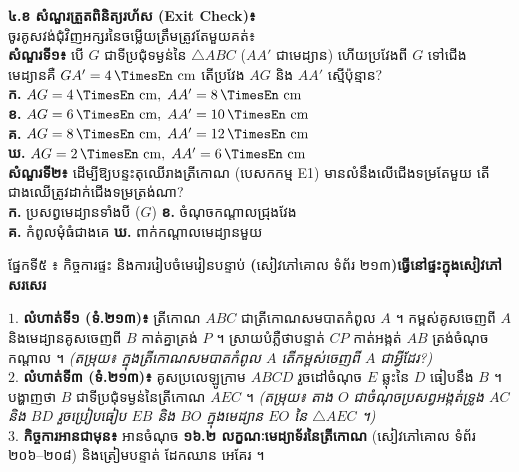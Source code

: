 \documentclass[a4paper,10pt]{article}
\newcommand{\en}[1]{{\TimesEn #1}}
\newcommand{\enbf}[1]{{\TimesEn\textbf{#1}}}
\newcommand{\unit}[1]{\,\text{\en{#1}}}
\newcommand{\tri}[1]{\ensuremath{\triangle #1}}
\newcommand{\secbar}[2]{%
  \vspace{3pt}%
  \begin{tcolorbox}[
    enhanced, sharp corners, colback=headgray, colframe=black,
    boxrule=0.9pt, boxsep=1pt, top=2.5pt, bottom=2.5pt, left=6pt, right=6pt,
    after skip=3pt
  ]
    {\muol\fontsize{9.2pt}{13.5pt}\selectfont #1}\hfill{\fontsize{8.3pt}{11.5pt}\selectfont\textbf{#2}}
  \end{tcolorbox}%
}
\begin{document}
\begin{minipage}[t]{8.4cm}\vspace{0pt}
  \begin{tcolorbox}[
    enhanced, sharp corners, colback=white, colframe=black, equal height group=rowE5,
    boxrule=0.85pt, boxsep=2pt, top=3pt, bottom=3pt, left=5pt, right=5pt
  ]
    \textbf{៤.ខ សំណួរត្រួតពិនិត្យរហ័ស (\en{Exit Check})៖}\\
    ចូរគូសវង់ជុំវិញអក្សរនៃចម្លើយត្រឹមត្រូវតែមួយគត់៖\\[3pt]
    \textbf{សំណួរទី១៖} បើ $G$ ជាទីប្រជុំទម្ងន់នៃ $\tri{ABC}$ ($AA'$ ជាមេដ្យាន) ហើយប្រវែងពី $G$ ទៅជើងមេដ្យានគឺ $GA' = 4\unit{cm}$ តើប្រវែង $AG$ និង $AA'$ ស្មើប៉ុន្មាន?\\
    \hspace*{0.2cm}\textbf{ក.} $AG=4\unit{cm},\; AA'=8\unit{cm}$\\
    \hspace*{0.2cm}\textbf{ខ.} $AG=6\unit{cm},\; AA'=10\unit{cm}$\\
    \hspace*{0.2cm}\textbf{គ.} $AG=8\unit{cm},\; AA'=12\unit{cm}$\\
    \hspace*{0.2cm}\textbf{ឃ.} $AG=2\unit{cm},\; AA'=6\unit{cm}$\\[4pt]
    \textbf{សំណួរទី២៖} ដើម្បីឱ្យបន្ទះតុឈើរាងត្រីកោណ (បេសកកម្ម E1) មានលំនឹងលើជើងទម្រតែមួយ តើជាងឈើត្រូវដាក់ជើងទម្រត្រង់ណា?\\
    \hspace*{0.2cm}\textbf{ក.} ប្រសព្វមេដ្យានទាំងបី ($G$) \hspace{0.25cm}
    \textbf{ខ.} ចំណុចកណ្ដាលជ្រុងវែង\\
    \hspace*{0.2cm}\textbf{គ.} កំពូលមុំធំជាងគេ \hspace{0.92cm}
    \textbf{ឃ.} ពាក់កណ្ដាលមេដ្យានមួយ
  \end{tcolorbox}
\end{minipage}

\secbar{ផ្នែកទី៥ ៖ កិច្ចការផ្ទះ និងការរៀបចំមេរៀនបន្ទាប់ \enbf{(}សៀវភៅគោល ទំព័រ ២១៣\enbf{)}}{ធ្វើនៅផ្ទះក្នុងសៀវភៅសរសេរ}

\begin{tcolorbox}[
  enhanced, sharp corners, colback=panelgray, colframe=black,
  boxrule=0.85pt, boxsep=2pt, top=3pt, bottom=3pt, left=6pt, right=6pt
]
  $1.$ \textbf{លំហាត់ទី១ (ទំ.២១៣)៖} ត្រីកោណ $ABC$ ជាត្រីកោណសមបាតកំពូល $A$ ។ កម្ពស់គូសចេញពី $A$ និងមេដ្យានគូសចេញពី $B$ កាត់គ្នាត្រង់ $P$ ។ ស្រាយបំភ្លឺថាបន្ទាត់ $CP$ កាត់អង្កត់ $AB$ ត្រង់ចំណុចកណ្ដាល ។ \textit{(តម្រុយ៖ ក្នុងត្រីកោណសមបាតកំពូល $A$ តើកម្ពស់ចេញពី $A$ ជាអ្វីដែរ?)}\\[2.5pt]
  $2.$ \textbf{លំហាត់ទី៣ (ទំ.២១៣)៖} គូសប្រលេឡូក្រាម $ABCD$ រួចដៅចំណុច $E$ ឆ្លុះនៃ $D$ ធៀបនឹង $B$ ។ បង្ហាញថា $B$ ជាទីប្រជុំទម្ងន់នៃត្រីកោណ $AEC$ ។ \textit{(តម្រុយ៖ តាង $O$ ជាចំណុចប្រសព្វអង្កត់ទ្រូង $AC$ និង $BD$ រួចប្រៀបធៀប $EB$ និង $BO$ ក្នុងមេដ្យាន $EO$ នៃ $\tri{AEC}$ ។)}\\[2.5pt]
  $3.$ \textbf{កិច្ចការអានជាមុន៖} អានចំណុច \textbf{១៦.២ លក្ខណៈមេដ្យាទ័រនៃត្រីកោណ} (សៀវភៅគោល ទំព័រ ២០៦--២០៨) និងត្រៀមបន្ទាត់ ដែកឈាន អេគែរ ។
\end{tcolorbox}
\end{document}
